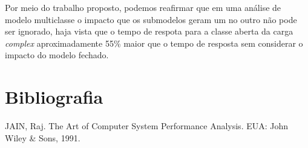\documentclass[11pt,a4paper]{abntex2}
\begin{document}
Por meio do trabalho proposto, podemos reafirmar que em uma análise de modelo multiclasse o impacto que os submodelos geram um no outro não pode ser ignorado, haja vista que o tempo de respota para a classe aberta da carga \textit{complex}  aproximadamente 55\% maior que o tempo de resposta sem considerar o impacto do modelo fechado.


\section*{\textbf{Bibliografia}}
JAIN, Raj. The Art of Computer System
Performance Analysis. EUA: John Wiley &
Sons, 1991.

	
\end{document}
